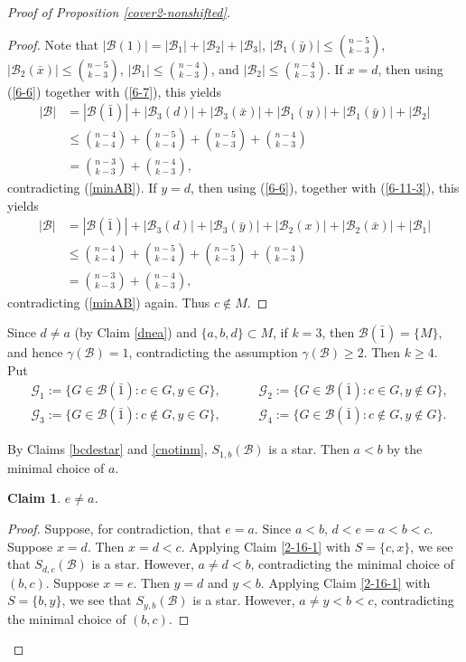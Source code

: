 \documentclass[a4paper,11pt]{article}
\newtheorem{claim}[theorem]{Claim}
\newcommand{\m}{\mathcal}
\begin{document}
\begin{proof}[Proof of Proposition \ref{cover2-nonshifted}]
\begin{proof}
Note that $|\m B(1)|=|\m B_1|+|\m B_2|+|\m B_3|$, 
$|\m B_1(\bar y)|\le {n-5\choose k-3}$, $|\m B_2(\bar x)|\le {n-5\choose k-3}$, $|\m B_1|\le {n-4\choose k-3}$, and $|\m B_2|\le {n-4\choose k-3}$.
If $x=d$, then using (\ref{6-6})
together with (\ref{6-7}), this yields
\begin{align*}
    |\m B|&=|\m B(\bar{1})|+|\m B_3(d)|+|\m B_3(\bar{x})|+|\m B_1(y)|+|\m B_1(\bar{y})|+|\m B_2|\\
    &\le {n-4\choose k-4}+{n-5\choose k-4}+{n-5\choose k-3}+{n-4\choose k-3}\\
    &={n-3\choose k-3}+{n-4\choose k-3},
\end{align*}
contradicting (\ref{minAB}).
If $y=d$, then using (\ref{6-6}),
together with (\ref{6-11-3}), this yields 
\begin{align*}
    |\m B|&=|\m B(\bar{1})|+|\m B_3(d)|+|\m B_3(\bar{y})|+|\m B_2(x)|+|\m B_2(\bar{x})|+|\m B_1|\\
    &\le {n-4\choose k-4}+{n-5\choose k-4}+{n-5\choose k-3}+{n-4\choose k-3}\\
    &={n-3\choose k-3}+{n-4\choose k-3},
\end{align*}
contradicting (\ref{minAB}) again.
Thus $c\not\in M$. 
\end{proof}


Since $d\ne a$ (by Claim \ref{dnea}) and $\{a,b,d\}\subset M$, if $k= 3$, then $\m B(\bar1)=\{M\}$, and hence $\gamma(\m B)=1$, contradicting the assumption $\gamma(\m B)\ge 2$.
Then $k\ge 4$.
Put 
\begin{align*}
    &\m G_1:=\{G\in \m B(\bar{1}):c\in G, y\in G\},\,\,\,\,\,\,\,\,\,\,\,\,\,\,\,\,\,\,\m G_2:=\{G\in \m B(\bar{1}):c\in G, y\not\in G\},\\
&\m G_3:=\{G\in \m B(\bar{1}):c\not\in G, y\in G\},\,\,\,\,\,\,\,\,\,\,\,\,\,\,\,\,\,\,\m G_4:=\{G\in \m B(\bar{1}):c\not\in G, y\not\in G\}.
\end{align*}


By Claims \ref{bcdestar} and \ref{cnotinm}, $S_{1,b}(\m B)$ is a star. Then $a<b$ by the minimal choice of $a$. 

\begin{claim}
$e\ne a$. 
\end{claim}


\begin{proof}
Suppose, for contradiction, that $e=a$. Since $a<b$, 
$d<e=a<b<c$. 
Suppose $x=d$. Then $x=d<c$. Applying Claim \ref{2-16-1} with $S=\{c,x\}$, we see that $S_{d,c}(\m B)$ is a star. However, $a\ne d<b$, contradicting the minimal choice of $(b,c)$. 
Suppose $x=e$. Then $y=d$ and $y<b$. Applying Claim \ref{2-16-1} with $S=\{b,y\}$, we see that $S_{y,b}(\m B)$ is a star. However, $a\ne y<b<c$, contradicting the minimal choice of $(b,c)$. 
\end{proof}


\end{proof}
\end{document}
